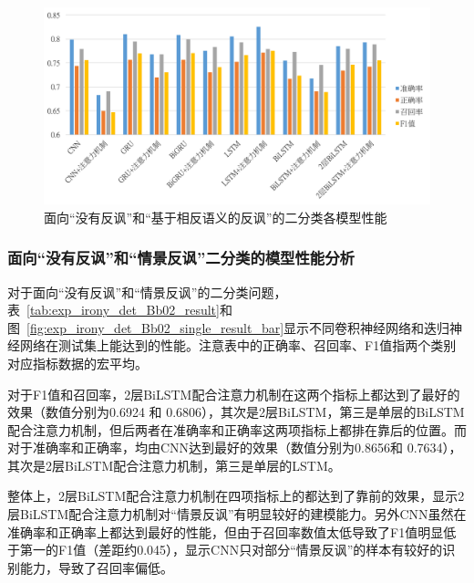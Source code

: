 \begin{figure}[H]
  \centering
  \includegraphics[width=\textwidth]{img/exp_irony_det_Bb01_single_result_bar.png}
  \caption{面向“没有反讽”和“基于相反语义的反讽”的二分类各模型性能}
  \label{fig:exp_irony_det_Bb01_single_result_bar}
\end{figure}

\subsubsection{面向“没有反讽”和“情景反讽”二分类的模型性能分析}

对于面向“没有反讽”和“情景反讽”的二分类问题，表~\ref{tab:exp_irony_det_Bb02_result}和图~\ref{fig:exp_irony_det_Bb02_single_result_bar}显示不同卷积神经网络和迭归神经网络在测试集上能达到的性能。注意表中的正确率、召回率、F1值指两个类别对应指标数据的宏平均。

对于F1值和召回率，2层BiLSTM配合注意力机制在这两个指标上都达到了最好的效果（数值分别为0.6924 和 0.6806），其次是2层BiLSTM，第三是单层的BiLSTM配合注意力机制，但后两者在准确率和正确率这两项指标上都排在靠后的位置。而对于准确率和正确率，均由CNN达到最好的效果（数值分别为0.8656和 0.7634），其次是2层BiLSTM配合注意力机制，第三是单层的LSTM。

整体上，2层BiLSTM配合注意力机制在四项指标上的都达到了靠前的效果，显示2层BiLSTM配合注意力机制对“情景反讽”有明显较好的建模能力。另外CNN虽然在准确率和正确率上都达到最好的性能，但由于召回率数值太低导致了F1值明显低于第一的F1值（差距约0.045），显示CNN只对部分“情景反讽”的样本有较好的识别能力，导致了召回率偏低。


